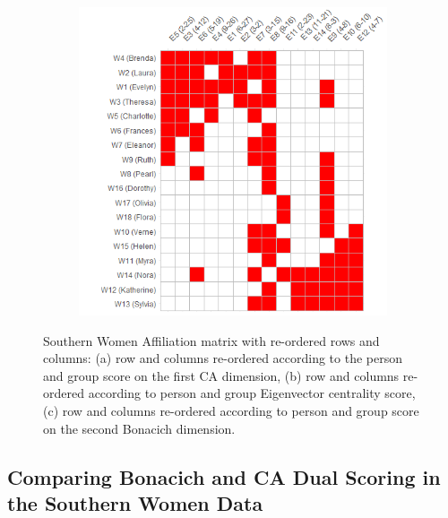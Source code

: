 \documentclass[a4paper,fleqn]{cas-sc}
\begin{document}
\begin{figure}[ht!]
\begin{subfigure}[b]{0.45\textwidth}
            \caption{}
            \label{fig:bon-reord1}
    \end{subfigure}
     \begin{subfigure}[b]{0.45\textwidth}
        \includegraphics[width=1.0\textwidth]{Plots/bon-reord2.png}
            \caption{}
            \label{fig:bon-reord2}
    \end{subfigure}
    \caption{Southern Women Affiliation matrix with re-ordered rows and columns: (a) row and columns re-ordered according to the person and group score on the first CA dimension, (b) row and columns re-ordered according to person and group Eigenvector centrality score, (c) row and columns re-ordered according to person and group score on the second Bonacich dimension.}
    \label{fig:ca-v-bon}
\end{figure}

\subsection{Comparing Bonacich and CA Dual Scoring in the Southern Women Data}
\end{document}
